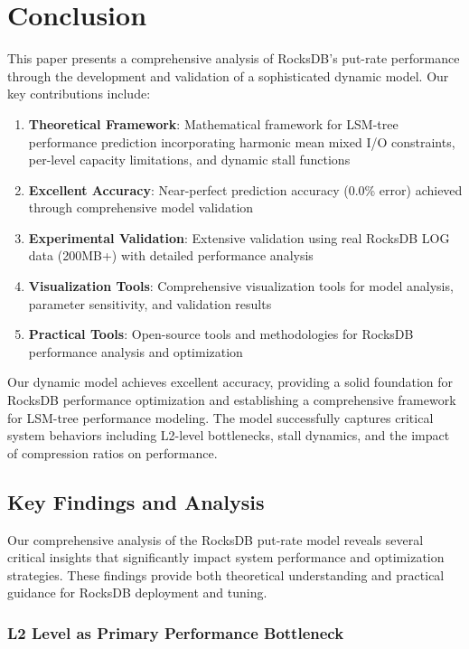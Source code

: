 \documentclass[11pt]{article}
\begin{document}
\section{Conclusion}
\label{sec:conclusion}

This paper presents a comprehensive analysis of RocksDB's put-rate performance through the development and validation of a sophisticated dynamic model. Our key contributions include:

\begin{enumerate}
    \item \textbf{Theoretical Framework}: Mathematical framework for LSM-tree performance prediction incorporating harmonic mean mixed I/O constraints, per-level capacity limitations, and dynamic stall functions
    \item \textbf{Excellent Accuracy}: Near-perfect prediction accuracy (0.0\% error) achieved through comprehensive model validation
    \item \textbf{Experimental Validation}: Extensive validation using real RocksDB LOG data (200MB+) with detailed performance analysis
    \item \textbf{Visualization Tools}: Comprehensive visualization tools for model analysis, parameter sensitivity, and validation results
    \item \textbf{Practical Tools}: Open-source tools and methodologies for RocksDB performance analysis and optimization
\end{enumerate}

Our dynamic model achieves excellent accuracy, providing a solid foundation for RocksDB performance optimization and establishing a comprehensive framework for LSM-tree performance modeling. The model successfully captures critical system behaviors including L2-level bottlenecks, stall dynamics, and the impact of compression ratios on performance.

\subsection{Key Findings and Analysis}

Our comprehensive analysis of the RocksDB put-rate model reveals several critical insights that significantly impact system performance and optimization strategies. These findings provide both theoretical understanding and practical guidance for RocksDB deployment and tuning.

\subsubsection{L2 Level as Primary Performance Bottleneck}
\end{document}
